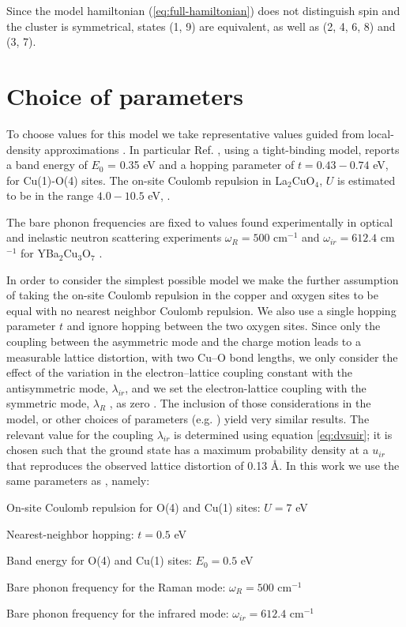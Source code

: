 Since the model hamiltonian (\ref{eq:full-hamiltonian}) does not distinguish spin and the cluster is symmetrical, states (1, 9) are equivalent, as well as (2, 4, 6, 8) and (3, 7).

\section{Choice of parameters}
\label{sec:model-parameters}

To choose values for this model we take representative values guided from local-density approximations \cite{Pickett1989}. 
In particular Ref. \cite{DeWeert1989}, using a tight-binding model, reports a band energy of $E_0$ = 0.35 eV and a hopping parameter of $t=0.43-0.74$ eV, for Cu(1)-O(4) sites.
The on-site Coulomb repulsion in La$_2$CuO$_4$, $U$  is estimated to be in the range $4.0-10.5$ eV, \cite{Hybertsen1989}. 

The bare phonon frequencies are fixed to values found experimentally in optical and inelastic neutron scattering experiments $\omega_R = 500$ cm$^{-1}$ and $\omega_{ir} = 612.4$ cm$^{-1}$ for YBa$_2$Cu$_3$O$_7$ \cite{?}.

In order to consider the simplest possible model we make the further assumption of taking the on-site Coulomb repulsion in the copper and oxygen sites to be equal with no nearest neighbor Coulomb repulsion. 
We also use a single hopping parameter $t$ and ignore hopping between the two oxygen sites. 
Since only the coupling between the asymmetric mode and the charge motion leads to a measurable lattice distortion, with two Cu–O bond lengths, we only consider the effect of the variation in the electron–lattice coupling constant with the antisymmetric mode, $\lambda_{ir}$, and we set the electron-lattice coupling with the symmetric mode, $\lambda_R$ , as zero \cite{Salkola1995}. 
The inclusion of those considerations in the model, or other choices of parameters (e.g. \cite{Salkola1994, Salkola1995}) yield very similar results.
The relevant value for the coupling $\lambda_{ir}$ is determined using equation \ref{eq:dvsuir}; it is chosen such that the ground state has a maximum probability density at a $u_{ir}$ that reproduces the observed lattice distortion of 0.13 \AA \cite{?}.
In this work we use the same parameters as \cite{DeLeon1999, Leon2008, MirandaMena2007,Mena2006}, namely:

\begin{itemize*}
\item On-site Coulomb repulsion for O(4) and Cu(1) sites: $U=7$ eV
\item Nearest-neighbor hopping: $t=0.5$ eV
\item Band energy for O(4) and Cu(1) sites: $E_0=0.5$ eV
\item Bare phonon frequency for the Raman mode: $\omega_R=500$ cm$^{-1}$
\item Bare phonon frequency for the infrared mode: $\omega_{ir}=612.4$ cm$^{-1}$
\end{itemize*}

